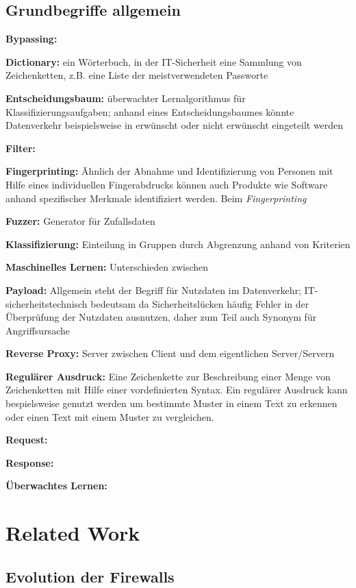 \subsection{Grundbegriffe allgemein}

\textbf{Bypassing:}

\textbf{Dictionary:} ein Wörterbuch, in der IT-Sicherheit eine Sammlung von Zeichenketten, z.B. eine Liste der meistverwendeten Passworte

\textbf{Entscheidungsbaum:} überwachter Lernalgorithmus für Klassifizierungsaufgaben; anhand eines Entscheidungsbaumes könnte Datenverkehr beispielsweise in erwünscht oder nicht erwünscht eingeteilt werden

\textbf{Filter:}

\textbf{Fingerprinting:} Ähnlich der Abnahme und Identifizierung von Personen mit Hilfe eines individuellen Fingerabdrucks können auch Produkte wie Software anhand spezifischer Merkmale identifiziert werden. Beim \emph{Fingerprinting}

\textbf{Fuzzer:} Generator für Zufallsdaten

\textbf{Klassifizierung:} Einteilung in Gruppen durch Abgrenzung anhand von Kriterien

\textbf{Maschinelles Lernen:} Unterschieden zwischen 

\textbf{Payload:} Allgemein steht der Begriff für Nutzdaten im Datenverkehr; IT-sicherheitstechnisch bedeutsam da Sicherheitslücken häufig Fehler in der Überprüfung der Nutzdaten ausnutzen, daher zum Teil auch Synonym für Angriffsursache

\textbf{Reverse Proxy:} Server zwischen Client und dem eigentlichen Server/Servern 

\textbf{Regulärer Ausdruck:} Eine Zeichenkette zur Beschreibung einer Menge von Zeichenketten mit Hilfe einer vordefinierten Syntax. Ein regulärer Ausdruck kann bespielsweise genutzt werden um bestimmte Muster in einem Text zu erkennen oder einen Text mit einem Muster zu vergleichen.

\textbf{Request:} 

\textbf{Response:}

\textbf{Überwachtes Lernen:} 

\section{Related Work} %

\subsection{Evolution der Firewalls}


